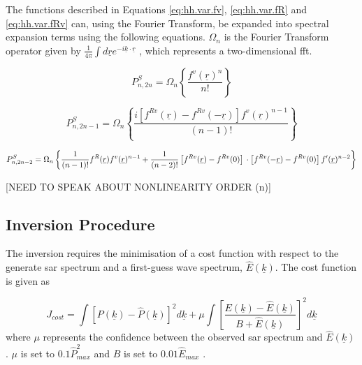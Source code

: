The functions described in Equations \ref{eq:hh.var.fv}, \ref{eq:hh.var.fR} and \ref{eq:hh.var.fRv} can, using the Fourier Transform, be expanded into spectral expansion terms using the following equations. $\Omega_n$ is the Fourier Transform operator given by $\frac{1}{4\pi}\int d\underline{r}e^{-i\underline{k}\cdot \underline{r}}$ \cite{Hasselmann1991}, which represents a two-dimensional \ac{fft}.

\begin{equation} \label{eq:hh.ft.2n}
    P^S_{n,2n} = \Omega_n \left \{ \frac{f^v(\underline{r})^n}{n!} \right \}
\end{equation}

\begin{equation} \label{eq:hh.ft.2n-1}
    P^S_{n,2n-1} = \Omega_n \left \{ \frac{i\left [ f^{Rv}(\underline{r}) - f^{Rv}(-\underline{r}) \right ] f^v(\underline{r})^{n-1}}{(n-1)!} \right \}
\end{equation}

\begin{equation} \label{eq:hh.ft.2n-2}
    P^S_{n,2n-2} = \Omega_n \left \{ \frac{1}{(n-1)!} f^R(\underline{r}) f^v(\underline{r})^{n-1} + \frac{1}{(n-2)!} \left [ f^{Rv}(\underline{r}) - f^{Rv}(0) \right ] \\ 
    \cdot \left [ f^{Rv}(-\underline{r}) - f^{Rv}(0) \right ] f'(\underline{r})^{n-2}  \right \}
\end{equation}

[NEED TO SPEAK ABOUT NONLINEARITY ORDER (n)]

\subsection{Inversion Procedure} \label{subsec:theory.hasselmann.inversion}
The inversion requires the minimisation of a cost function \cite{Hasselmann1991} with respect to the generate \acs{sar} spectrum and a first-guess wave spectrum, $\hat{E}(\underline{k})$. The cost function is given as

\begin{equation} \label{eq:hh.inversion.J}
    J_{cost} = \int \left [ P(\underline{k}) - \hat{P}(\underline{k}) \right ]^2 d\underline{k} + \mu \int \left [ \frac{ E(\underline{k}) - \hat{E}(\underline{k})}{B+\hat{E}(\underline{k})} \right ]^2d\underline{k}
\end{equation}
where $\mu$ represents the confidence between the observed \acs{sar} spectrum and $\hat{E}(\underline{k})$. $\mu$ is set to $0.1\hat{P}_{max}^2$ and $B$ is set to $0.01\hat{E}_{max}$ \cite{Hasselmann1991}. 

